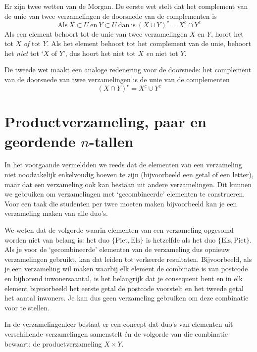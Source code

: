 Er zijn twee wetten van de Morgan. De eerste wet stelt dat het complement van de unie van twee verzamelingen de doorsnede van de complementen is 
\begin{equation*}
\mathrm{Als~}X\subset U \mathrm{~en~} Y\subset U \mathrm{~dan~is~}  (X\cup Y)^c=X^c \cap  Y^c 
\end{equation*}
Als een element behoort tot de unie van twee verzamelingen $X$ en $Y$, hoort het tot $X$ \emph{of} tot $Y$. Als het element behoort tot het complement van de unie, behoort het \emph{niet} tot `$X$ of $Y$', dus hoort het niet tot $X$ \emph{en} niet tot $Y$. 

De tweede wet maakt een analoge redenering voor de doorsnede:  het complement van de doorsnede van twee verzamelingen is de unie van de complementen 
\begin{equation*}
 (X\cap Y)^c=X^c \cup  Y^c
\end{equation*}

\section{Productverzameling, paar en geordende $n$-tallen}
\label{sec:prodverz}
In het voorgaande vermeldden we reeds dat de elementen van een verzameling niet noodzakelijk enkelvoudig hoeven te zijn (bijvoorbeeld een getal of een letter), maar dat een verzameling ook kan bestaan uit andere verzamelingen. Dit kunnen we gebruiken om verzamelingen met  `gecombineerde' elementen te construeren. Voor een taak die studenten per twee moeten maken bijvoorbeeld kan je een verzameling maken van alle duo's. 

We weten dat de volgorde waarin elementen van een verzameling opgesomd worden niet van belang is: het duo $\{\mathrm{Piet},\mathrm{Els} \}$ is hetzelfde als het duo $\{\mathrm{Els},\mathrm{Piet} \}$. Als je voor de `gecombineerde' elementen van de verzameling dus opnieuw verzamelingen gebruikt, kan dat leiden tot verkeerde resultaten. Bijvoorbeeld, als je een verzameling wil maken waarbij elk element de combinatie is van postcode en bijhorend inwonersaantal, is het belangrijk dat je consequent bent en in elk element bijvoorbeeld het eerste getal de postcode voorstelt en het tweede getal het aantal inwoners. Je kan dus geen verzameling gebruiken om deze combinatie voor te stellen.  \label{pg:postcodes}

In de verzamelingenleer bestaat er een concept dat duo's van elementen uit verschillende verzamelingen samenstelt \'en de volgorde van die combinatie bewaart: de  productverzameling $X \times Y$. 

